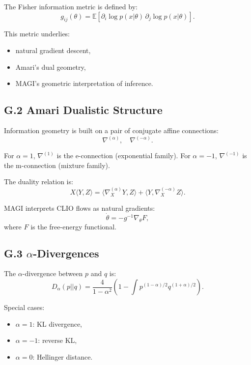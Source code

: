 \documentclass[11pt,a4paper,twocolumn]{article}
\begin{document}
The Fisher information metric is defined by:
\[
g_{ij}(\theta) =
\mathbb{E}\left[
\partial_i \log p(x|\theta)
\,
\partial_j \log p(x|\theta)
\right].
\]

This metric underlies:
\begin{itemize}
\item natural gradient descent,
\item Amari's dual geometry,
\item MAGI's geometric interpretation of inference.
\end{itemize}


\subsection*{G.2 Amari Dualistic Structure}

Information geometry is built on a pair of conjugate affine connections:
\[
\nabla^{(\alpha)}, \quad \nabla^{(-\alpha)}.
\]

For $\alpha = 1$, $\nabla^{(1)}$ is the e-connection (exponential family).  
For $\alpha = -1$, $\nabla^{(-1)}$ is the m-connection (mixture family).

The duality relation is:
\[
X\langle Y,Z\rangle =
\langle \nabla^{(\alpha)}_X Y, Z\rangle
+
\langle Y, \nabla^{(-\alpha)}_X Z\rangle.
\]

MAGI interprets CLIO flows as natural gradients:
\[
\dot{\theta} = - g^{-1} \nabla_\theta F,
\]
where $F$ is the free-energy functional.


\subsection*{G.3 $\alpha$-Divergences}

The $\alpha$-divergence between $p$ and $q$ is:
\[
D_\alpha(p||q) =
\frac{4}{1-\alpha^2}
\left(
1 - \int p^{(1-\alpha)/2} q^{(1+\alpha)/2}
\right).
\]

Special cases:
\begin{itemize}
\item $\alpha = 1$: KL divergence,
\item $\alpha = -1$: reverse KL,
\item $\alpha = 0$: Hellinger distance.
\end{itemize}
\end{document}
